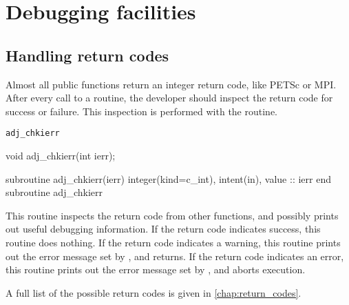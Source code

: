\chapter{Debugging facilities} \label{chap:debugging}

\begin{synopsis}
\end{synopsis}
\minitoc
\vspace{\fill}
\newpage

\section{Handling return codes}
Almost all public \libadjoint functions return an integer return code,
like PETSc or MPI. After every call to a \libadjoint routine, the developer
should inspect the return code for success or failure. This inspection is
performed with the  routine.
\begin{boxwithtitle}{\texttt{adj_chkierr}}
\begin{minipage}{\columnwidth}
\begin{ccode}
  void adj_chkierr(int ierr);
\end{ccode}
\begin{fortrancode}
  subroutine adj_chkierr(ierr)
    integer(kind=c_int), intent(in), value :: ierr
  end subroutine adj_chkierr
\end{fortrancode}
\end{minipage}
\end{boxwithtitle}
This routine inspects the return code from other \libadjoint functions,
and possibly prints out useful debugging information. If the return code
indicates success, this routine does nothing. If the return code indicates
a warning, this routine prints out the error message set by \libadjoint,
and returns. If the return code indicates an error, this routine prints out the
error message set by \libadjoint, and aborts execution.

A full list of the possible return codes is given in \autoref{chap:return_codes}.
